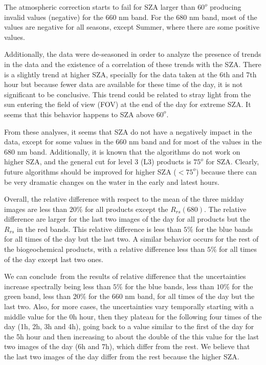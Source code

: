 \documentclass[onecolumn,3p,letterpaper,11pt]{elsarticle}
\begin{document}
The atmospheric correction starts to fail for SZA larger than $60^o$ producing invalid values (negative) for the 660 nm band.
For the 680 nm band, most of the values are negative for all seasons, except Summer, where there are some positive values.

Additionally, the data were de-seasoned in order to analyze the presence of trends in the data and the existence of a correlation of these trends with the SZA. 
There is a slightly trend at higher SZA, specially for the data taken at the 6th and 7th hour but because fewer data are available for these time of the day, it is not significant to be conclusive. 
This trend could be related to stray light from the sun entering the field of view (FOV) at the end of the day for extreme SZA. 
It seems that this behavior happens to SZA above $60^o$. 

From these analyses, it seems that SZA do not have a negatively impact in the data, except for some values in the 660 nm band and for most of the values in the 680 nm band. Additionally, it is known that the algorithms do not work on higher SZA, and the general cut for level 3 (L3) products is $75^o$ for SZA. Clearly, future algorithms should be improved for higher SZA ($<75^o$) because there can be very dramatic changes on the water in the early and latest hours.

Overall, the relative difference with respect to the mean of the three midday images are less than $20\%$ for all products except the $R_{rs}(680)$. The relative difference are larger for the last two images of the day for all products but the $R_{rs}$ in the red bands. This relative difference is less than $5\%$ for the blue bands for all times of the day but the last two. A similar behavior occurs for the rest of the biogeochemical products, with a relative difference less than $5\%$ for all times of the day except last two ones. 

We can conclude~from the results of relative difference that the uncertainties increase spectrally being less than $5\%$ for the blue bands, less than $10\%$ for the green band, less than $20\%$ for the 660 nm band, for all times of the day but the last two. Also, for more cases, the uncertainties vary temporally starting with a middle value for the 0h hour, then they plateau for the following four times of the day (1h, 2h, 3h and 4h), going back to a value similar to the first of the day for the 5h hour and then increasing to about the double of the this value for the last two images of the day (6h and 7h), which differ from the rest. We believe that the last two images of the day differ from the rest because the higher SZA.
\end{document}
